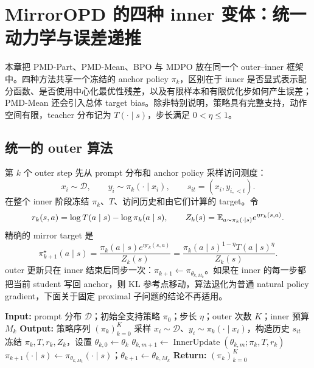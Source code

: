 \chapter{MirrorOPD 的四种 inner 变体：统一动力学与误差递推}
\label{chap:mirroropd-unified-inner}

本章把 PMD-Part、PMD-Mean、BPO 与 MDPO 放在同一个 outer--inner 框架中。四种方法共享一个冻结的 anchor policy $\pi_k$，区别在于 inner 是否显式表示配分函数、是否使用中心化最优性残差，以及有限样本和有限优化步如何产生误差；PMD-Mean 还会引入总体 target bias。除非特别说明，策略具有完整支持，动作空间有限，teacher 分布记为 $T(\cdot\mid s)$，步长满足 $0<\eta\leq 1$。

\section{统一的 outer 算法}
\label{sec:unified-outer}

第 $k$ 个 outer step 先从 prompt 分布和 anchor policy 采样访问测度：
\[
 x_i\sim\mathcal D,\qquad y_i\sim\pi_k(\cdot\mid x_i),
 \qquad s_{it}=(x_i,y_{i,<t}).
\]
在整个 inner 阶段冻结 $\pi_k$、$T$、访问历史和由它们计算的 target。令
\[
 r_k(s,a)=\log T(a\mid s)-\log\pi_k(a\mid s),
 \qquad
 Z_k(s)=\mathbb{E}_{a\sim\pi_k(\cdot\mid s)}e^{\eta r_k(s,a)}.
\]
精确的 mirror target 是
\begin{equation}
\label{eq:unified-mirror-target}
 \pi_{k+1}^{\star}(a\mid s)
 =\frac{\pi_k(a\mid s)e^{\eta r_k(s,a)}}{Z_k(s)}
 =\frac{\pi_k(a\mid s)^{1-\eta}T(a\mid s)^\eta}{Z_k(s)}.
\end{equation}
outer 更新只在 inner 结束后同步一次：$\pi_{k+1}\leftarrow\pi_{\theta_{k,M_k}}$。如果在 inner 的每一步都把当前 student 写回 anchor，则 KL 参考点移动，算法退化为普通 natural policy gradient，下面关于固定 proximal 子问题的结论不再适用。

\begin{algorithm}
\caption{MirrorOPD 的统一 outer--inner 迭代\\{\small\textit{Semantics: 根据本章统一定义重构；inner 目标由四种变体分别给出}}}
\begin{algorithmic}
\STATE \textbf{Input:} prompt 分布 $\mathcal D$；初始全支持策略 $\pi_0$；步长 $\eta$；outer 次数 $K$；inner 预算 $M_k$
\STATE \textbf{Output:} 策略序列 $(\pi_k)_{k=0}^{K}$
    \STATE 采样 $x_i\sim\mathcal D$、$y_i\sim\pi_k(\cdot\mid x_i)$，构造历史 $s_{it}$
    \STATE 冻结 $\pi_k,T,r_k,Z_k$，设置 $\theta_{k,0}\gets\theta_k$
        \STATE $\theta_{k,m+1}\gets\operatorname{InnerUpdate}(\theta_{k,m};\pi_k,T,r_k)$
    \ENDFOR
    \STATE $\pi_{k+1}(\cdot\mid s)\gets\pi_{\theta_{k,M_k}}(\cdot\mid s)$；$\theta_{k+1}\gets\theta_{k,M_k}$
\ENDFOR
\STATE \textbf{Return:} $(\pi_k)_{k=0}^{K}$
\end{algorithmic}
\end{algorithm}

